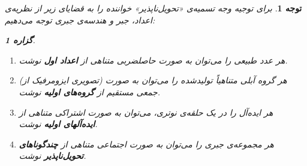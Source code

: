 \documentclass[12pt,a4paper]{report}
\theoremstyle{colorhead}
\newtheorem{prop}[thm]{گزاره}
\newtheorem{tav}[thm]{توجه}
\begin{document}
\begin{tav}
برای توجیه وجه تسمیه‌‌ی «تحویل‌ناپذیر» خواننده را به قضایای زیر از
نظریه‌ی اعداد، 
جبر و هندسه‌ی جبری توجه می‌دهیم:
\begin{prop}
\hfill 
	\begin{enumerate}
	\item 
	هر عدد طبیعی را می‌توان به صورت حاصلضربی متناهی از \textbf{اعداد اول }نوشت. 
	\item 
	هر گروه آبلی متناهیاً تولیدشده را می‌توان به صورت (تصویری ایزومرفیک از) جمعی مستقیم از \textbf{گروه‌های اولیه }نوشت.
\item 
هر ایده‌آل را در یک حلقه‌ی نوتری، می‌توان به صورت اشتراکی متناهی از \textbf{ایده‌آلهای اولیه} نوشت.
\item 
هر مجموعه‌ی جبری را می‌توان به صورت اجتماعی  متناهی از \textbf{چندگوناهای تحویل‌ناپذیر} نوشت. 
\end{enumerate}
	\end{prop}
	\end{tav}
\end{document}
